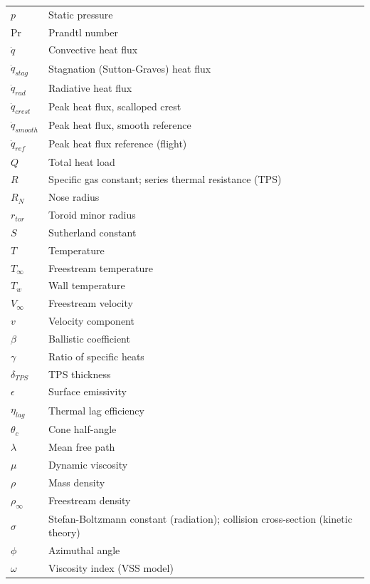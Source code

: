 \begin{longtable}{|>{\raggedright\arraybackslash}p{3.4cm}|>{\raggedright\arraybackslash}p{8.2cm}|}
    $p$& Static pressure\\
    $\text{Pr}$& Prandtl number\\
    $\dot{q}$& Convective heat flux\\
    $\dot{q}_{stag}$& Stagnation (Sutton-Graves) heat flux\\
    $\dot{q}_{rad}$& Radiative heat flux\\
    $\dot{q}_{crest}$& Peak heat flux, scalloped crest\\
    $\dot{q}_{smooth}$& Peak heat flux, smooth reference\\
    $\dot{q}_{ref}$& Peak heat flux reference (flight)\\
    $Q$& Total heat load\\
    $R$& Specific gas constant; series thermal resistance (TPS)\\
    $R_N$& Nose radius\\
    $r_{tor}$& Toroid minor radius\\
    $S$& Sutherland constant\\
    $T$& Temperature\\
    $T_\infty$& Freestream temperature\\
    $T_w$& Wall temperature\\
    $V_\infty$& Freestream velocity\\
    $v$& Velocity component\\
    $\beta$& Ballistic coefficient\\
    $\gamma$& Ratio of specific heats\\
    $\delta_{TPS}$& TPS thickness\\
    $\epsilon$& Surface emissivity\\
    $\eta_{lag}$& Thermal lag efficiency\\
    $\theta_c$& Cone half-angle\\
    $\lambda$& Mean free path\\
    $\mu$& Dynamic viscosity\\
    $\rho$& Mass density\\
    $\rho_\infty$& Freestream density\\
    $\sigma$& Stefan-Boltzmann constant (radiation); collision cross-section (kinetic theory)\\
    $\phi$& Azimuthal angle\\
    $\omega$& Viscosity index (VSS model)\\
\hline
\end{longtable}
\endgroup
